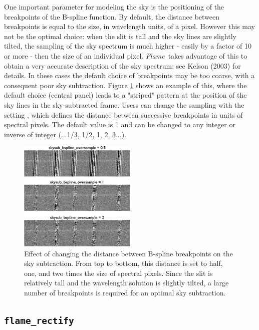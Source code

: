 \documentclass[a4paper]{article}
\newcommand{\flame}{\emph{Flame}}
\begin{document}
\begin{sloppypar}
One important parameter for modeling the sky is the positioning of the breakpoints of the B-spline function. By default, the distance between breakpoints is equal to the size, in wavelength units, of a pixel. However this may not be the optimal choice: when the slit is tall and the sky lines are slightly tilted, the sampling of the sky spectrum is much higher - easily by a factor of 10 or more - then the size of an individual pixel. \flame\ takes advantage of this to obtain a very accurate description of the sky spectrum; see Kelson (2003) for details. In these cases the default choice of breakpoints may be too coarse, with a consequent poor sky subtraction. Figure \ref{fig:bspline} shows an example of this, where the default choice (central panel) leads to a "striped" pattern at the position of the sky lines in the sky-subtracted frame. Users can change the sampling with the setting , which defines the distance between successive breakpoints in units of spectral pixels. The default value is 1 and can be changed to any integer or inverse of integer (...1/3, 1/2, 1, 2, 3...).


\begin{figure}[tbp]
\centering
\includegraphics[width=0.5\textwidth]{oversample}
\caption{Effect of changing the distance between B-spline breakpoints on the sky subtraction. From top to bottom, this distance is set to half, one, and two times the size of spectral pixels. Since the slit is relatively tall and the wavelength solution is slightly tilted, a large number of breakpoints is required for an optimal sky subtraction.}
\label{fig:bspline}
\end{figure}


\subsection{\texttt{flame\_rectify}}


\end{sloppypar}
\end{document}
